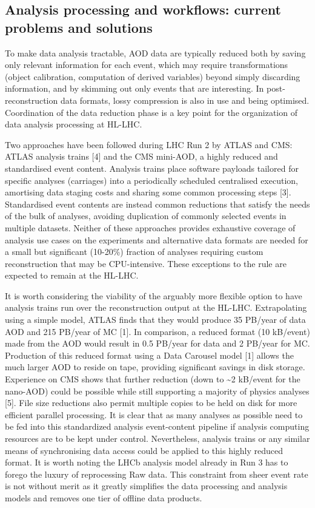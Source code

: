 \documentclass[11pt,a4paper]{article}
\begin{document}
\hypertarget{analysis-processing-and-workflows-current-problems-and-solutions}{%
\subsection{Analysis processing and workflows: current problems and
solutions}\label{analysis-processing-and-workflows-current-problems-and-solutions}}

To make data analysis tractable, AOD data are typically reduced both by
saving only relevant information for each event, which may require
transformations (object calibration, computation of derived variables)
beyond simply discarding information, and by skimming out only events
that are interesting. In post-reconstruction data formats, lossy
compression is also in use and being optimised. Coordination of the data
reduction phase is a key point for the organization of data analysis
processing at HL-LHC.

Two approaches have been followed during LHC Run 2 by ATLAS and CMS:
ATLAS analysis trains {[}4{]} and the CMS mini-AOD, a highly reduced and
standardised event content. Analysis trains place software payloads
tailored for specific analyses (carriages) into a periodically scheduled
centralised execution, amortising data staging costs and sharing some
common processing steps {[}3{]}. Standardised event contents are instead
common reductions that satisfy the needs of the bulk of analyses,
avoiding duplication of commonly selected events in multiple datasets.
Neither of these approaches provides exhaustive coverage of analysis use
cases on the experiments and alternative data formats are needed for a
small but significant (10-20\%) fraction of analyses requiring custom
reconstruction that may be CPU-intensive. These exceptions to the rule
are expected to remain at the HL-LHC.

It is worth considering the viability of the arguably more flexible
option to have analysis trains run over the reconstruction output at the
HL-LHC. Extrapolating using a simple model, ATLAS finds that they would
produce 35 PB/year of data AOD and 215 PB/year of MC {[}1{]}. In
comparison, a reduced format (10 kB/event) made from the AOD would
result in 0.5 PB/year for data and 2 PB/year for MC. Production of this
reduced format using a Data Carousel model {[}1{]} allows the much
larger AOD to reside on tape, providing significant savings in disk
storage. Experience on CMS shows that further reduction (down to
\textasciitilde2 kB/event for the nano-AOD) could be possible while
still supporting a majority of physics analyses {[}5{]}. File size
reductions also permit multiple copies to be held on disk for more
efficient parallel processing. It is clear that as many analyses as
possible need to be fed into this standardized analysis event-content
pipeline if analysis computing resources are to be kept under control.
Nevertheless, analysis trains or any similar means of synchronising data
access could be applied to this highly reduced format. It is worth
noting the LHCb analysis model already in Run 3 has to forego the luxury
of reprocessing Raw data. This constraint from sheer event rate is not
without merit as it greatly simplifies the data processing and analysis
models and removes one tier of offline data products.
\end{document}
